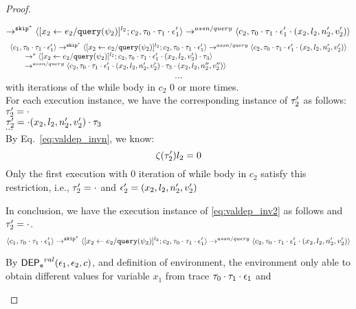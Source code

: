 \begin{proof}
\begin{case}[$\trace_2 = \cdot$]
\begin{subproof}[Subproof]
\begin{enumerate}
\[  \rightarrow^{\mathtt{skip}^*} 
  \langle [\mathrel{ {x}_2 \leftarrow e_2 / {\tt query}(\psi_2) }]^{l_2} ; {c}_2, \mathtt{\tau}_0 \cdot \mathtt{\tau}_1 \cdot \mathtt{\epsilon}_1' \rangle 
  \rightarrow^{assn/query} 
  \langle {c}_2,  \mathtt{\tau}_0 \cdot \mathtt{\tau}_1 \cdot \mathtt{\epsilon}_1' \cdot (x_2, l_2, n_2', v_2') \rangle 
 \]
%
  \[
  \begin{array}{l}
  \langle c_1, \mathtt{\tau}_0 \cdot \mathtt{\tau}_1 \cdot \mathtt{\epsilon}_1' \rangle 
  \rightarrow^{\mathtt{skip}^*} 
  \langle [\mathrel{ {x}_2 \leftarrow e_2 / {\tt query}(\psi_2) }]^{l_2} ; {c}_2, \mathtt{\tau}_0 \cdot \mathtt{\tau}_1 \cdot \mathtt{\epsilon}_1' \rangle 
  \rightarrow^{assn/query} 
  \langle {c}_2,  \mathtt{\tau}_0 \cdot \mathtt{\tau}_1 \cdot \mathtt{\epsilon}_1' \cdot (x_2, l_2, n_2', v_2') \rangle 
  \\ \qquad
  \rightarrow^{*} 
  \langle [\mathrel{ {x}_2 \leftarrow e_2 / {\tt query}(\psi_2) }]^{l_2} ; {c}_2, 
  \mathtt{\tau}_0 \cdot \mathtt{\tau}_1 \cdot \mathtt{\epsilon}_1' \cdot (x_2, l_2, v_2') \cdot \mathtt{\tau}_3 \rangle 
  \\ \qquad
  \rightarrow^{assn/query} 
  \langle {c}_2,  \mathtt{\tau}_0 \cdot \mathtt{\tau}_1 \cdot \mathtt{\epsilon}_1' \cdot (x_2, l_2, n_2', v_2') \cdot \mathtt{\tau}_3 \cdot (x_2, l_2, n_2'', v_2'') \rangle 
 \end{array}
 \]
\[
  \cdots
\] 
with iterations of the while body in $c_2$ $0$ or more times.
%
\\
%
For each execution instance, we have the corresponding instance of $\mathtt{\tau}_2'$ as follows:
\\
  $\mathtt{\tau}_2'  = \cdot$
\\
$\mathtt{\tau}_2' = \cdot (x_2, l_2, n_2', v_2') \cdot \mathtt{\tau}_3 $
%
\\
$\cdots$
%
\\
%
By Eq.~\ref{eq:valdep_invn}, we know:
%
\[
 \mathtt{\zeta}(\mathtt{\tau}_2') l_2 = 0
\]
%
Only the first execution with 0 iteration of while body in $c_2$ satisfy this restriction, i.e., $\mathtt{\tau}_2' = \cdot$ and $\mathtt{\epsilon}_2' = (x_2, l_2, n_2', v_2')$
%
\end{enumerate}
In conclusion, we have the execution instance of \ref{eq:valdep_inv2}  as follows and $\mathtt{\tau}_2' = \cdot$.
  \[
  \langle c_1, \mathtt{\tau}_0 \cdot \mathtt{\tau}_1 \cdot \mathtt{\epsilon}_1' \rangle 
  \rightarrow^{\mathtt{skip}^*} 
  \langle [\mathrel{ {x}_2 \leftarrow e_2 / {\tt query}(\psi_2) }]^{l_2} ; {c}_2, \mathtt{\tau}_0 \cdot \mathtt{\tau}_1 \cdot \mathtt{\epsilon}_1' \rangle 
  \rightarrow^{assn/query} 
  \langle {c}_2,  \mathtt{\tau}_0 \cdot \mathtt{\tau}_1 \cdot \mathtt{\epsilon}_1' \cdot (x_2, l_2, n_2', v_2') \rangle 
 \]
\end{subproof}
%
By $\mathsf{DEP_{\mathtt{e}}}^{val}(\mathtt{\epsilon}_1, \mathtt{\epsilon}_2, c)$, and definition of environment, 
the environment only able to obtain different values for variable $x_1$ 
from trace $\mathtt{\tau}_0 \cdot \mathtt{\tau}_1 \cdot \mathtt{\epsilon}_1$ and 

\end{case}
\end{proof}
